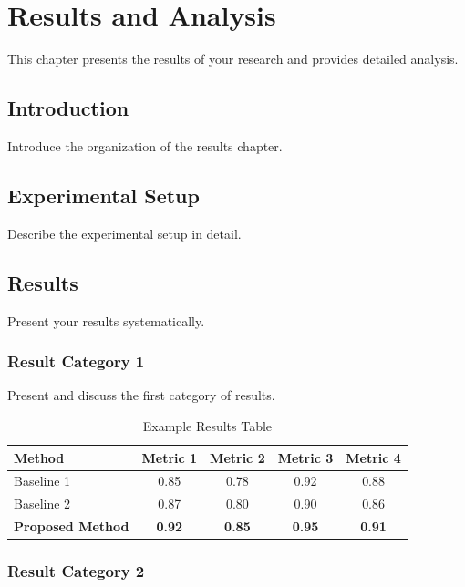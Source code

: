 \chapter{Results and Analysis}
\label{ch:results}

This chapter presents the results of your research and provides detailed analysis.

\section{Introduction}
\label{sec:results-introduction}

Introduce the organization of the results chapter.

\section{Experimental Setup}
\label{sec:experimental-setup}

Describe the experimental setup in detail.

\section{Results}
\label{sec:results-section}

Present your results systematically.

\subsection{Result Category 1}
\label{subsec:result1}

Present and discuss the first category of results.

\begin{table}[htbp]
\centering
\caption{Example Results Table}
\label{tab:results1}
\begin{tabular}{@{}lcccc@{}}
\toprule
Method & Metric 1 & Metric 2 & Metric 3 & Metric 4 \\
\midrule
Baseline 1 & 0.85 & 0.78 & 0.92 & 0.88 \\
Baseline 2 & 0.87 & 0.80 & 0.90 & 0.86 \\
\textbf{Proposed Method} & \textbf{0.92} & \textbf{0.85} & \textbf{0.95} & \textbf{0.91} \\
\bottomrule
\end{tabular}
\end{table}

\subsection{Result Category 2}
\label{subsec:result2}


